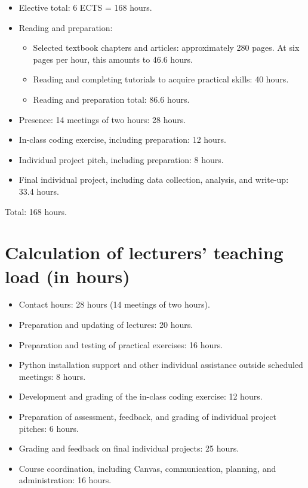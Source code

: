 \documentclass[a4paper,12pt]{report}
\begin{document}
\begin{itemize}
    \item Elective total: 6 ECTS = 168 hours.
    \item Reading and preparation:
    \begin{itemize}
        \item Selected textbook chapters and articles: approximately 280 pages. At six pages per hour, this amounts to 46.6 hours.
        \item Reading and completing tutorials to acquire practical skills: 40 hours.
        \item Reading and preparation total: 86.6 hours.
    \end{itemize}
    \item Presence: 14 meetings of two hours: 28 hours.
    \item In-class coding exercise, including preparation: 12 hours.
    \item Individual project pitch, including preparation: 8 hours.
    \item Final individual project, including data collection, analysis, and write-up: 33.4 hours.
\end{itemize}

Total: 168 hours.

\chapter{Calculation of lecturers' teaching load (in hours)}

\begin{itemize}
    \item Contact hours: 28 hours (14 meetings of two hours).
    \item Preparation and updating of lectures: 20 hours.
    \item Preparation and testing of practical exercises: 16 hours.
    \item Python installation support and other individual assistance outside scheduled meetings: 8 hours.
    \item Development and grading of the in-class coding exercise: 12 hours.
    \item Preparation of assessment, feedback, and grading of individual project pitches: 6 hours.
    \item Grading and feedback on final individual projects: 25 hours.
    \item Course coordination, including Canvas, communication, planning, and administration: 16 hours.
\end{itemize}
\end{document}
